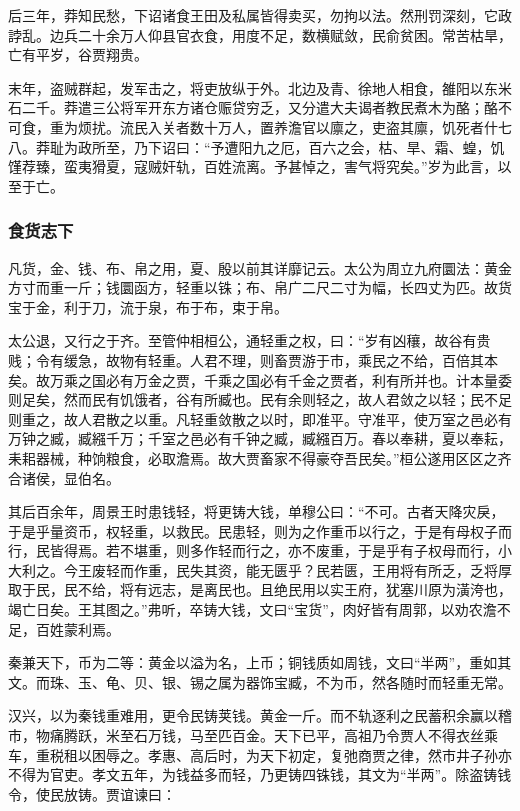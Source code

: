 \documentclass[]{article}
\begin{document}
后三年，莽知民愁，下诏诸食王田及私属皆得卖买，勿拘以法。然刑罚深刻，它政誖乱。边兵二十余万人仰县官衣食，用度不足，数横赋敛，民俞贫困。常苦枯旱，亡有平岁，谷贾翔贵。

末年，盗贼群起，发军击之，将吏放纵于外。北边及青、徐地人相食，雒阳以东米石二千。莽遣三公将军开东方诸仓赈贷穷乏，又分遣大夫谒者教民煮木为酪；酪不可食，重为烦扰。流民入关者数十万人，置养澹官以廪之，吏盗其廪，饥死者什七八。莽耻为政所至，乃下诏曰：``予遭阳九之厄，百六之会，枯、旱、霜、蝗，饥馑荐臻，蛮夷猾夏，寇贼奸轨，百姓流离。予甚悼之，害气将究矣。''岁为此言，以至于亡。

\hypertarget{header-n1624}{%
\subsubsection{食货志下}\label{header-n1624}}

凡货，金、钱、布、帛之用，夏、殷以前其详靡记云。太公为周立九府圜法：黄金方寸而重一斤；钱圜函方，轻重以铢；布、帛广二尺二寸为幅，长四丈为匹。故货宝于金，利于刀，流于泉，布于布，束于帛。

太公退，又行之于齐。至管仲相桓公，通轻重之权，曰：``岁有凶穰，故谷有贵贱；令有缓急，故物有轻重。人君不理，则畜贾游于市，乘民之不给，百倍其本矣。故万乘之国必有万金之贾，千乘之国必有千金之贾者，利有所并也。计本量委则足矣，然而民有饥饿者，谷有所臧也。民有余则轻之，故人君敛之以轻；民不足则重之，故人君散之以重。凡轻重敛散之以时，即准平。守准平，使万室之邑必有万钟之臧，臧繦千万；千室之邑必有千钟之臧，臧繦百万。春以奉耕，夏以奉耘，耒耜器械，种饷粮食，必取澹焉。故大贾畜家不得豪夺吾民矣。''桓公遂用区区之齐合诸侯，显伯名。

其后百余年，周景王时患钱轻，将更铸大钱，单穆公曰：``不可。古者天降灾戾，于是乎量资币，权轻重，以救民。民患轻，则为之作重币以行之，于是有母权子而行，民皆得焉。若不堪重，则多作轻而行之，亦不废重，于是乎有子权母而行，小大利之。今王废轻而作重，民失其资，能无匮乎？民若匮，王用将有所乏，乏将厚取于民，民不给，将有远志，是离民也。且绝民用以实王府，犹塞川原为潢洿也，竭亡日矣。王其图之。''弗听，卒铸大钱，文曰``宝货''，肉好皆有周郭，以劝农澹不足，百姓蒙利焉。

秦兼天下，币为二等：黄金以溢为名，上币；铜钱质如周钱，文曰``半两''，重如其文。而珠、玉、龟、贝、银、锡之属为器饰宝臧，不为币，然各随时而轻重无常。

汉兴，以为秦钱重难用，更令民铸荚钱。黄金一斤。而不轨逐利之民蓄积余赢以稽市，物痛腾跃，米至石万钱，马至匹百金。天下已平，高祖乃令贾人不得衣丝乘车，重税租以困辱之。孝惠、高后时，为天下初定，复弛商贾之律，然市井子孙亦不得为官吏。孝文五年，为钱益多而轻，乃更铸四铢钱，其文为``半两''。除盗铸钱令，使民放铸。贾谊谏曰：
\end{document}
